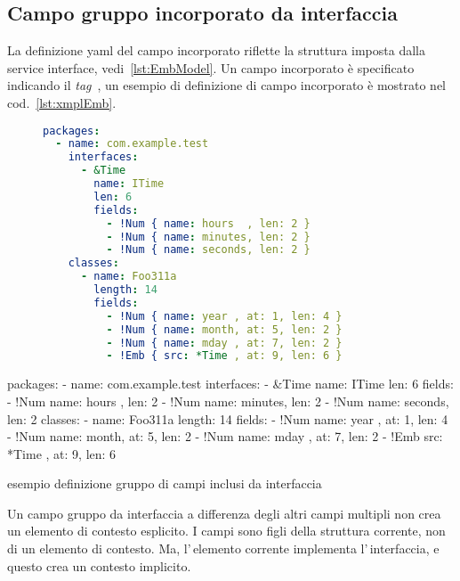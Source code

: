 \subsection{Campo gruppo incorporato da interfaccia} \label{sub:yaml.emb}
La definizione yaml del campo incorporato riflette la struttura imposta dalla
service interface, vedi~\ref{lst:EmbModel}.
Un campo incorporato è specificato indicando il \textsl{tag} 
\,, 
un esempio di definizione di campo incorporato è mostrato nel 
cod.~\ref{lst:xmplEmb}.

\ifesource
\begin{figure*}[!htb]
\begin{lstlisting}[language=yaml, 
caption={esempio definizione di campi inclusi da interfaccia}, 
label=lst:xmplEmp]
packages:
  - name: com.example.test
    interfaces:
      - &Time
        name: ITime
        len: 6
        fields:
          - !Num { name: hours  , len: 2 }
          - !Num { name: minutes, len: 2 }
          - !Num { name: seconds, len: 2 }
    classes:
      - name: Foo311a
        length: 14
        fields:
          - !Num { name: year , at: 1, len: 4 }
          - !Num { name: month, at: 5, len: 2 }
          - !Num { name: mday , at: 7, len: 2 }
          - !Emb { src: *Time , at: 9, len: 6 }
\end{lstlisting}
\end{figure*}
\else
\begin{elisting}[!htb]
\begin{yamlcode}
packages:
  - name: com.example.test
    interfaces:
      - &Time
        name: ITime
        len: 6
        fields:
          - !Num { name: hours  , len: 2 }
          - !Num { name: minutes, len: 2 }
          - !Num { name: seconds, len: 2 }
    classes:
      - name: Foo311a
        length: 14
        fields:
          - !Num { name: year , at: 1, len: 4 }
          - !Num { name: month, at: 5, len: 2 }
          - !Num { name: mday , at: 7, len: 2 }
          - !Emb { src: *Time , at: 9, len: 6 }
\end{yamlcode}
\caption{esempio definizione gruppo di campi inclusi da interfaccia}
\label{lst:xmplEmb}
\end{elisting}
\fi

Un campo gruppo da interfaccia a differenza degli altri campi multipli non 
crea un elemento di contesto esplicito. I campi sono figli della struttura 
corrente, non di un elemento di contesto. Ma, l'\,elemento corrente
implementa l'\,interfaccia, e questo crea un contesto implicito.

